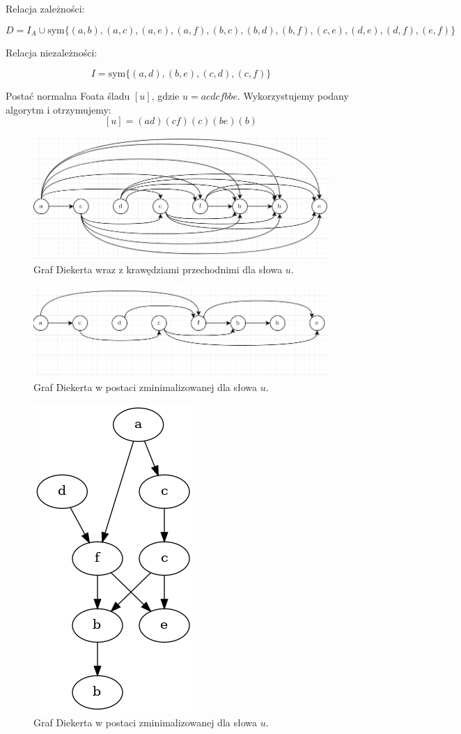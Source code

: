 \documentclass[11pt]{article}
\begin{document}
Relacja zależności:

$$ D = I_A \cup \text{sym}\{(a,b), (a, c), (a, e), (a,f), (b, c), (b, d), (b,f), (c,e), (d, e), (d, f), (e, f)\}$$

Relacja niezależności:

$$ I = \text{sym} \{(a, d), (b, e), (c, d), (c, f)  \}$$

Postać normalna Foata śladu \([u]\), gdzie \(u=acdcfbbe\).
Wykorzystujemy podany algorytm i otrzymujemy:
$$[u] = (ad)(cf)(c)(be)(b)$$


\begin{figure}[H]
\centering
\includegraphics[width=.9\linewidth]{./graph2_1.png}
\caption{Graf Diekerta wraz z krawędziami przechodnimi dla słowa \(u\).}
\end{figure}


\begin{figure}[H]
\centering
\includegraphics[width=.9\linewidth]{./graph2_2.png}
\caption{Graf Diekerta w postaci zminimalizowanej dla słowa \(u\).}
\end{figure}


\begin{figure}[H]
\centering
\includegraphics[width=0.4\linewidth]{graph2.png}
\caption{\label{}Graf Diekerta w postaci zminimalizowanej dla słowa \(u\).}
\end{figure}
\end{document}
